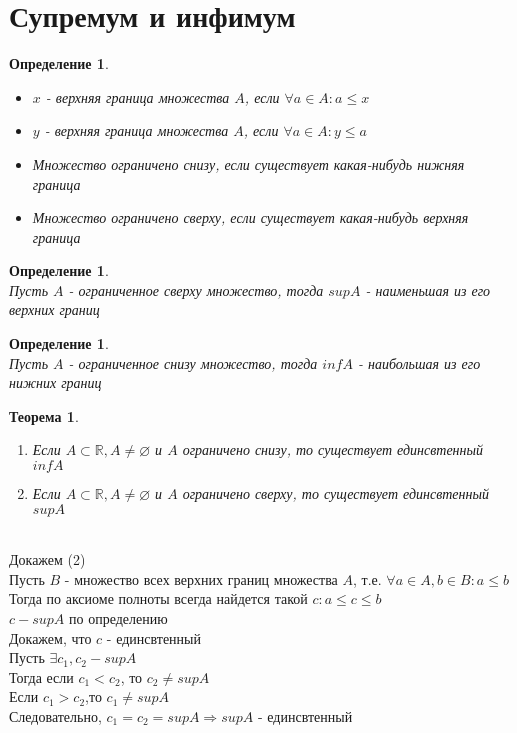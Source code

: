 \documentclass[12pt,letterpaper]{report}
\makeatletter
\newtheorem*{theorem-non}{Теорема}
\newtheorem{conj}[theorem]{Определение}
\newcommand{\R}{\mathbb{R}}
\renewenvironment{proof}[1][\proofname]{%
   \par\pushQED{\qed}\normalfont%
   \topsep6\p@\@plus6\p@\relax
   \trivlist\item[\hskip\labelsep\bfseries#1\@addpunct{.}]%
   \ignorespaces
}{%
   \popQED\endtrivlist\@endpefalse
}
\makeatother
\begin{document}
\section{Супремум и инфимум}
\begin{conj}
    \quad \\
    \begin{itemize}
        \item[] $x$ - верхняя граница множества $A$, если $\forall a \in A: a \leqslant x$
        \item[] $y$ - верхняя граница множества $A$, если $\forall a \in A: y \leqslant a$ 
        \item[] Множество ограничено снизу, если существует какая-нибудь нижняя граница
        \item[] Множество ограничено сверху, если существует какая-нибудь верхняя граница
    \end{itemize}
\end{conj}
\begin{conj}
    \quad \\
    Пусть $A$ - ограниченное сверху множество, тогда $sup A$ - наименьшая из его верхних границ
\end{conj}
\begin{conj}
    \quad \\
    Пусть $A$ - ограниченное снизу множество, тогда $inf A$ - наибольшая из его нижних границ
\end{conj}
\begin{theorem-non}
    \quad \\
    \begin{enumerate}
        \item Если $A \subset \R, A \neq \varnothing $ и $ A $ ограничено снизу, то существует единсвтенный $inf A$
        \item Если $A \subset \R, A \neq \varnothing $ и $ A $ ограничено сверху, то существует единсвтенный $sup A$
    \end{enumerate}
\end{theorem-non}
\begin{proof}
    \quad \\
    Докажем (2) \\
    Пусть $B$ - множество всех верхних границ множества $A$, т.е. $\forall a \in A, b \in B: a \leqslant b$ \\
    Тогда по аксиоме полноты всегда найдется такой $c: a \leqslant c \leqslant b$ \\
    $c - sup A$ по определению \\
    Докажем, что $c$ - единсвтенный \\
    Пусть $\exists c_1, c_2 - sup A$ \\
    Тогда если $c_1 < c_2$, то $c_2 \neq sup A$ \\
    Если $c_1 > c_2$,то $c_1 \neq sup A$ \\
    Следовательно, $c_1 = c_2 = sup A \Longrightarrow sup A$ - единсвтенный  
\end{proof}
\end{document}
